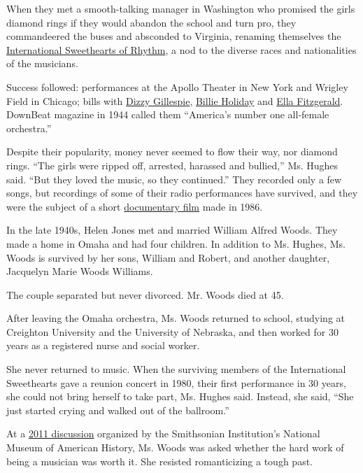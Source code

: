 When they met a smooth-talking manager in Washington who promised the
girls diamond rings if they would abandon the school and turn pro, they
commandeered the buses and absconded to Virginia, renaming themselves
the \href{https://youtu.be/WczP3PyHt20}{International Sweethearts of
Rhythm}, a nod to the diverse races and nationalities of the musicians.

Success followed: performances at the Apollo Theater in New York and
Wrigley Field in Chicago; bills with
\href{https://www.nytimes3xbfgragh.onion/1993/01/07/arts/dizzy-gillespie-who-sounded-some-of-modern-jazz-s-earliest-notes-dies-at-75.html}{Dizzy
Gillespie},
\href{https://www.nytimes3xbfgragh.onion/1959/07/18/archives/billie-holiday-dies-here-at-14-jazz-singer-had-wide-influence.html}{Billie
Holiday} and
\href{https://www.nytimes3xbfgragh.onion/1996/06/16/nyregion/ella-fitzgerald-the-voice-of-jazz-dies-at-79.html}{Ella
Fitzgerald}. DownBeat magazine in 1944 called them ``America's number
one all-female orchestra.''

Despite their popularity, money never seemed to flow their way, nor
diamond rings. ``The girls were ripped off, arrested, harassed and
bullied,'' Ms. Hughes said. ``But they loved the music, so they
continued.'' They recorded only a few songs, but recordings of some of
their radio performances have survived, and they were the subject of a
short
\href{https://jezebelproductions.org/international-sweethearts-of-rhythm/}{documentary
film} made in 1986.

In the late 1940s, Helen Jones met and married William Alfred Woods.
They made a home in Omaha and had four children. In addition to Ms.
Hughes, Ms. Woods is survived by her sons, William and Robert, and
another daughter, Jacquelyn Marie Woods Williams.

The couple separated but never divorced. Mr. Woods died at 45.

After leaving the Omaha orchestra, Ms. Woods returned to school,
studying at Creighton University and the University of Nebraska, and
then worked for 30 years as a registered nurse and social worker.

She never returned to music. When the surviving members of the
International Sweethearts gave a reunion concert in 1980, their first
performance in 30 years, she could not bring herself to take part, Ms.
Hughes said. Instead, she said, ``She just started crying and walked out
of the ballroom.''

At a \href{https://www.youtube.com/watch?v=_Cjmg8Jepvw}{2011 discussion}
organized by the Smithsonian Institution's National Museum of American
History, Ms. Woods was asked whether the hard work of being a musician
was worth it. She resisted romanticizing a tough past.


